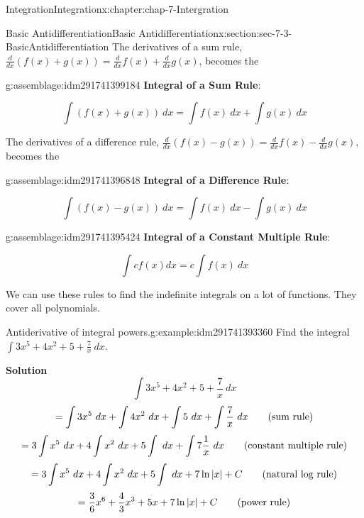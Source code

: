 \documentclass[oneside,10pt,]{book}
\newcommand{\terminology}[1]{\textbf{#1}}
\numberwithin{equation}{section}
\begin{document}
\begin{chapterptx}{Integration}{}{Integration}{}{}{x:chapter:chap-7-Intergration}
\begin{sectionptx}{Basic Antidifferentiation}{}{Basic Antidifferentiation}{}{}{x:section:sec-7-3-BasicAntidifferentiation}
The derivatives of a sum rule, \(\frac{d}{dx}(f(x)+g(x))=\frac{d}{dx}f(x)+\frac{d}{dx}g(x)\), becomes the%
\begin{assemblage}{}{g:assemblage:idm291741399184}%
\terminology{Integral of a Sum Rule}:%
\par
%
\begin{equation*}
\int (f(x)+g(x))\ dx=\int f(x)\ dx+\int g(x)\ dx
\end{equation*}
%
\end{assemblage}
The derivatives of a difference rule, \(\frac{d}{dx}(f(x)-g(x))=\frac{d}{dx}f(x)-\frac{d}{dx}g(x)\), becomes the%
\begin{assemblage}{}{g:assemblage:idm291741396848}%
\terminology{Integral of a Difference Rule}:%
\par
%
\begin{equation*}
\int (f(x)-g(x))\ dx=\int f(x)\ dx-\int g(x)\ dx
\end{equation*}
%
\end{assemblage}
\begin{assemblage}{}{g:assemblage:idm291741395424}%
\terminology{Integral of a Constant Multiple Rule}:%
\par
%
\begin{equation*}
\int cf(x) dx=c\int f(x)\ dx
\end{equation*}
%
\end{assemblage}
We can use these rules to find the indefinite integrals on a lot of functions.  They cover all polynomials.%
\begin{example}{Antiderivative of integral powers.}{g:example:idm291741393360}%
Find the integral \(\int 3x^5+4x^2+5+\frac{7}{x}\ dx\).%
\par
\terminology{Solution}%
%
\begin{equation*}
\int 3x^5+4x^2+5+\frac{7}{x}\ dx
\end{equation*}
%
\begin{equation*}
=\int 3x^5\ dx+\int 4x^2\ dx+\int 5\ dx+\int \frac{7}{x}\ dx\qquad\hbox{(sum rule)}
\end{equation*}
%
\begin{equation*}
=3\int x^5\ dx+4\int x^2\ dx+5\int \ dx+\int 7\frac{1}{x}\ dx\qquad\hbox{(constant multiple rule)}
\end{equation*}
%
\begin{equation*}
=3\int x^5\ dx+4\int x^2\ dx+5\int \ dx+ 7\ln|x|+C\qquad\hbox{(natural log rule)}
\end{equation*}
%
\begin{equation*}
=\frac{3}{6} x^6+\frac{4}{3}x^3+5x+ 7\ln|x|+C\qquad\hbox{(power rule)}

\end{equation*}
\end{example}
\end{sectionptx}
\end{chapterptx}
\end{document}
